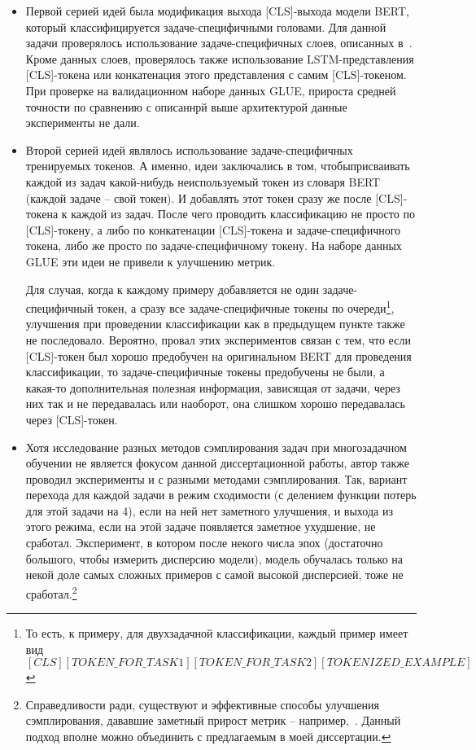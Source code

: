 \begin{itemize} 
 \item Первой серией идей была модификация выхода [CLS]-выхода модели BERT, который классифицируется задаче-специфичными головами. Для данной задачи проверялось использование задаче-специфичных слоев, описанных в~\cite{GhostBERT2021, TaskEmbedded2021, el-nouby2021xcit}. Кроме данных слоев, проверялось также использование LSTM-представления [CLS]-токена или конкатенация этого представления с самим [CLS]-токеном. При проверке на валидационном наборе данных GLUE, прироста средней точности по сравнению с описаннрй выше архитектурой данные эксперименты не дали. 
\item Второй серией идей являлось использование задаче-специфичных тренируемых токенов. А именно, идеи заключались в том, чтобыприсваивать каждой из задач какой-нибудь неиспользуемый токен из словаря BERT (каждой задаче -- свой токен). И добавлять этот токен сразу же после [CLS]-токена к каждой из задач. После чего проводить классификацию не просто по [CLS]-токену, а либо по конкатенации [CLS]-токена и задаче-специфичного токена, либо же просто по задаче-специфичному токену. На наборе данных GLUE эти идеи не привели к улучшению метрик.

 Для случая, когда к каждому примеру добавляется не один задаче-специфичный токен, а сразу все задаче-специфичные токены по очереди\footnote{То есть, к примеру, для двухзадачной классификации, каждый пример имеет вид \textit{$[CLS] [TOKEN\_FOR\_TASK1] [TOKEN\_FOR\_TASK2][TOKENIZED\_EXAMPLE]$}}, улучшения при проведении классификации как в предыдущем пункте также не последовало. 
Вероятно, провал этих экспериментов связан с тем, что если [CLS]-токен был хорошо предобучен на оригинальном BERT для проведения классификации, то задаче-специфичные токены предобучены не были, а какая-то дополнительная полезная информация, зависящая от задачи, через них так и не передавалась или наоборот, она слишком хорошо передавалась через [CLS]-токен. 

\item Хотя исследование разных методов сэмплирования задач при многозадачном обучении не является фокусом данной диссертационной работы, автор также проводил эксперименты и с разными методами сэмплирования. Так, вариант перехода для каждой задачи в режим сходимости (с делением функции потерь для этой задачи на 4), если на ней нет заметного улучшения, и выхода из этого режима, если на этой задаче появляется заметное ухудшение, не сработал. Эксперимент, в котором после некого числа эпох (достаточно большого, чтобы измерить дисперсию модели), модель обучалась только на некой доле самых сложных примеров с самой высокой дисперсией, тоже не сработал.\footnote{Справедливости ради, существуют и эффективные способы улучшения сэмплирования, дававшие заметный прирост метрик -- например,~\cite{GradTS}. Данный подход вполне можно объединить с предлагаемым в моей диссертации.}
\end{itemize}

